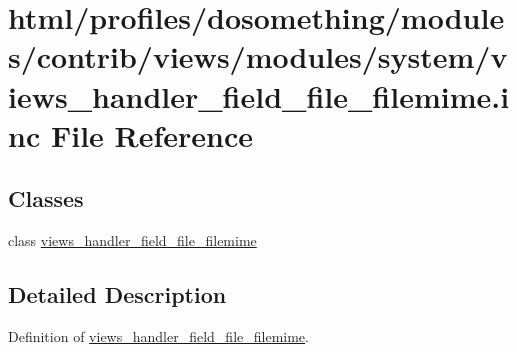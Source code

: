\hypertarget{views__handler__field__file__filemime_8inc}{
\section{html/profiles/dosomething/modules/contrib/views/modules/system/views\_\-handler\_\-field\_\-file\_\-filemime.inc File Reference}
\label{views__handler__field__file__filemime_8inc}
}
\subsection*{Classes}
\begin{DoxyCompactItemize}
\item 
class \hyperlink{classviews__handler__field__file__filemime}{views\_\-handler\_\-field\_\-file\_\-filemime}
\end{DoxyCompactItemize}


\subsection{Detailed Description}
Definition of \hyperlink{classviews__handler__field__file__filemime}{views\_\-handler\_\-field\_\-file\_\-filemime}. 
